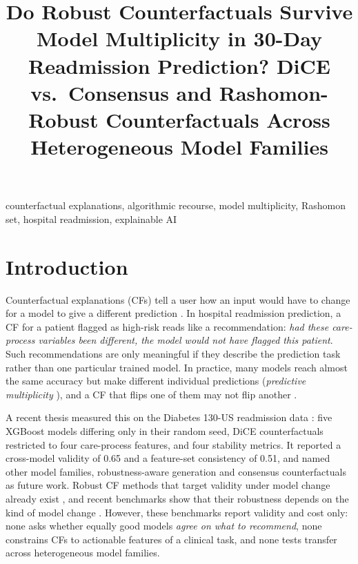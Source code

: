 \documentclass[conference]{IEEEtran}
\begin{document}
\title{Do Robust Counterfactuals Survive Model Multiplicity in 30-Day Readmission Prediction? DiCE vs.\ Consensus and Rashomon-Robust Counterfactuals Across Heterogeneous Model Families}

\author{
\IEEEauthorblockA{[Department], [Institution]\\
[City], [Country]}}

\maketitle

\begin{abstract}
\end{abstract}

\begin{IEEEkeywords}
counterfactual explanations, algorithmic recourse, model multiplicity, Rashomon set, hospital readmission, explainable AI
\end{IEEEkeywords}

\section{Introduction}
Counterfactual explanations (CFs) tell a user how an input would have to change for a model to give a different
prediction \cite{wachter2018}. In hospital readmission prediction, a CF for a patient flagged as high-risk reads like a
recommendation: \emph{had these care-process variables been different, the model would not have flagged this
patient}. Such recommendations are only meaningful if they describe the prediction task rather than one particular
trained model. In practice, many models reach almost the same accuracy but make different individual predictions
(\emph{predictive multiplicity} \cite{marx2020multiplicity}), and a CF that flips one of them may not flip another
\cite{pawelczyk2020multiplicity,black2022consistent}.

A recent thesis \cite{emekci2026} measured this on the Diabetes 130-US readmission data \cite{strack2014}: five XGBoost
models differing only in their random seed, DiCE \cite{mothilal2020dice} counterfactuals restricted to four
care-process features, and four stability metrics. It reported a cross-model validity of 0.65 and a feature-set
consistency of 0.51, and named other model families, robustness-aware generation and consensus counterfactuals as
future work. Robust CF methods that target validity under model change already exist
\cite{upadhyay2021roar,dutta2022robx,hamman2023,jiang2024argumentative,turbal2025ellice}, and recent benchmarks show
that their robustness depends on the kind of model change \cite{kostrzewa2026which,tan2026densityflow}. However,
these benchmarks report validity and cost only: none asks whether equally good models \emph{agree on what to
recommend}, none constrains CFs to actionable features of a clinical task, and none tests transfer across
heterogeneous model families.
\end{document}
